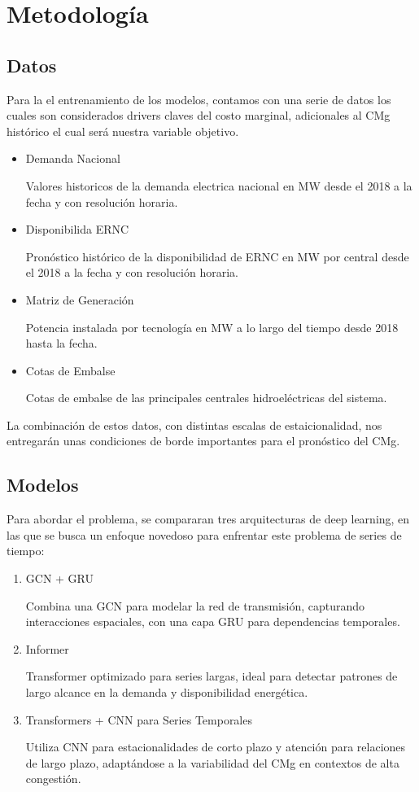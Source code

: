 \documentclass[twocolumn]{article}
\begin{document}
\section{Metodología}

\subsection{Datos}
Para la el entrenamiento de los modelos, contamos con una serie de datos
los cuales son considerados drivers claves del costo marginal, adicionales al CMg histórico
el cual será nuestra variable objetivo.

\begin{itemize}
    \item Demanda Nacional
    
    Valores historicos de la demanda electrica nacional en MW desde el 2018 a la fecha y con
	resolución horaria.

    \item Disponibilida ERNC
    
    Pronóstico histórico de la disponibilidad de ERNC en MW por central 
	desde el 2018 a la fecha y con
	resolución horaria.

    \item Matriz de Generación
    
	Potencia instalada por tecnología en MW a lo largo del tiempo desde 2018 hasta la fecha.

    \item Cotas de Embalse
    
	Cotas de embalse de las principales centrales hidroeléctricas del sistema.
\end{itemize}

La combinación de estos datos, con distintas escalas de estaicionalidad, nos entregarán unas condiciones
de borde importantes para el pronóstico del CMg.

\subsection{Modelos}
Para abordar el problema, se compararan tres arquitecturas de deep learning, en las que se busca
un enfoque novedoso para enfrentar este problema de series de tiempo:

\begin{enumerate}
    \item GCN + GRU

	Combina una GCN para modelar la red de transmisión, capturando interacciones espaciales, con 	una capa GRU para dependencias temporales.

    \item Informer
    
	Transformer optimizado para series largas, ideal para detectar patrones de largo alcance en la 	demanda y disponibilidad energética.
    \item Transformers + CNN para Series Temporales

	Utiliza CNN para estacionalidades de corto plazo y atención para relaciones de largo plazo, 		adaptándose a la variabilidad del CMg en contextos de alta congestión.
    
\end{enumerate}
\end{document}
